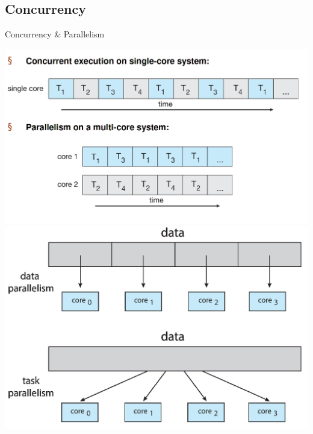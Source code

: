 \documentclass[10pt]{beamer}
\begin{document}
\subsection{Concurrency}
\begin{frame}[allowframebreaks]{Concurrency \& Parallelism}
  \begin{center}
      \includegraphics[keepaspectratio, width=\textwidth, height=\textheight-2\baselineskip-2\baselineskip]{img/020_concurrency_parallelism.png} \\ \framebreak
      \includegraphics[keepaspectratio, width=\textwidth, height=\textheight-2\baselineskip-2\baselineskip]{img/020_parallelism_data_task.png} \\
 \end{center}
\end{frame}
\end{document}
